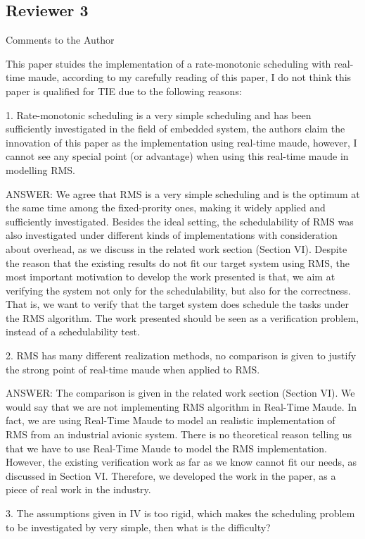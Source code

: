 \documentclass[10pt,journal]{IEEEtran}
\begin{document}
\subsection{Reviewer 3}
Comments to the Author

This paper stuides the implementation of a rate-monotonic scheduling
with real-time maude, according to my carefully reading of this paper,
I do not think this paper is qualified for TIE due to the following
reasons:

1. Rate-monotonic scheduling is a very simple scheduling and has been
sufficiently investigated in the field of embedded system, the authors
claim the innovation of this paper as the implementation using
real-time maude, however, I cannot see any special point (or
advantage) when using this real-time maude in modelling RMS.

ANSWER: We agree that RMS is a very simple scheduling and is the
optimum at the same time among the fixed-prority ones, making it
widely applied and sufficiently investigated. Besides the ideal
setting, the schedulability of RMS was also investigated under
different kinds of implementations with consideration about overhead,
as we discuss in the related work section (Section VI). Despite the
reason that the existing results do not fit our target system using
RMS, the most important motivation to develop the work presented is
that, we aim at verifying the system not only for the schedulability,
but also for the correctness. That is, we want to verify that the
target system does schedule the tasks under the RMS algorithm. The
work presented should be seen as a verification problem, instead of a
schedulability test.

2. RMS has many different realization methods, no comparison is given
to justify the strong point of real-time maude when applied to RMS.

ANSWER: The comparison is given in the related work section (Section
VI). We would say that we are not implementing RMS algorithm in
Real-Time Maude. In fact, we are using Real-Time Maude to model an
realistic implementation of RMS from an industrial avionic
system. There is no theoretical reason telling us that we have to use
Real-Time Maude to model the RMS implementation. However, the existing
verification work as far as we know cannot fit our needs, as discussed
in Section VI. Therefore, we developed the work in the paper, as a
piece of real work in the industry.

3. The assumptions given in IV is too rigid, which makes the
scheduling problem to be investigated by very simple, then what is the
difficulty?
\end{document}
